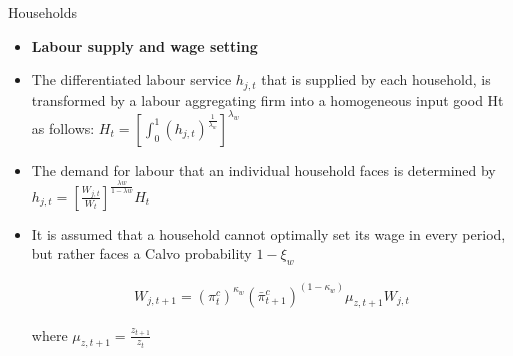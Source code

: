 \documentclass[9pt]{beamer}
\let\olditem\item
\renewcommand{\item}{%
\olditem\vspace{\fill}}
\begin{document}
\begin{frame}{Households}
\begin{itemize}
    \item \textbf{Labour supply and wage setting}

    \item The differentiated labour service $h_{j,t}$ that is supplied by each household, is transformed by a labour aggregating firm into a homogeneous input good Ht as follows: $\left.H_{t}=\left[\int_{0}^{1}\left(h_{j, t}\right)^{\frac{1}{\lambda_{w}}}\right]^{\lambda_{w}}$
    
    \item The demand for labour that an individual household faces is determined by $h_{j, t}=\left[\frac{W_{j, t}}{W_{t}}\right]^{\frac{\lambda w}{1-\lambda w}} H_{t}$
    
    \item It is assumed that a household cannot optimally set its wage in every period, but rather faces a Calvo probability $1 - \xi_w$
    
$$
    \begin{array}{c}
    W_{j, t+1}=\left(\pi_{t}^{c}\right)^{\kappa_{w}}\left(\bar{\pi}_{t+1}^{c}\right)^{\left(1-\kappa_{w}\right)} \mu_{z, t+1} W_{j, t}
    \end{array}
$$

where $ \mu_{z, t+1}=\frac{z_{t+1}}{z_{t}}$

\end{itemize}

\end{frame}
\end{document}

